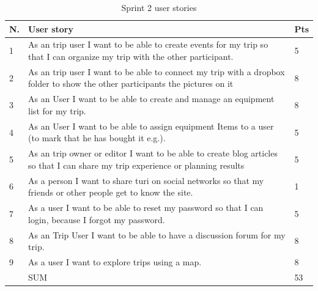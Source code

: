 \documentclass[a4paper]{article}
\begin{document}
\begin{table}
  \centering
  \begin{tabulary}{1.0\textwidth}{|L|L|L|}
    \hline
    N. & User story & Pts \\ \hline

    1&As an trip user I want to be able to create events for my trip so that I can organize my trip with the other participant.
    & 5 \\ \hline

    2&As an trip user I want to be able to connect my trip with a dropbox folder to show the other participants the pictures on it
    & 8 \\ \hline

    3 &As an User I want to be able to create and manage an equipment list for my trip. 
    & 8 \\ \hline

    4 & As an User I want to be able to assign equipment Items to a user (to mark that he has bought it e.g.).
    & 5 \\ \hline

    5& As an trip owner or editor I want to be able to create blog articles so that I can share my trip experience or planning results
    & 5 \\ \hline

    6& As a person I want to share turi on social networks so that my friends or other people get to know the site.
    & 1 \\ \hline

    7& As a user I want to be able to reset my password so that I can login, because I forgot my password.
    &5 \\ \hline

    8& As an Trip User I want to be able to have a discussion forum for my trip.
    & 8 \\ \hline

    9& As a user I want to explore trips using a map.
    & 8 \\ \hline

    &SUM&53 \\ \hline

    
  \end{tabulary}
  \caption{Sprint 2 user stories}
\label{tab:sprint2}
\end{table}
\end{document}
